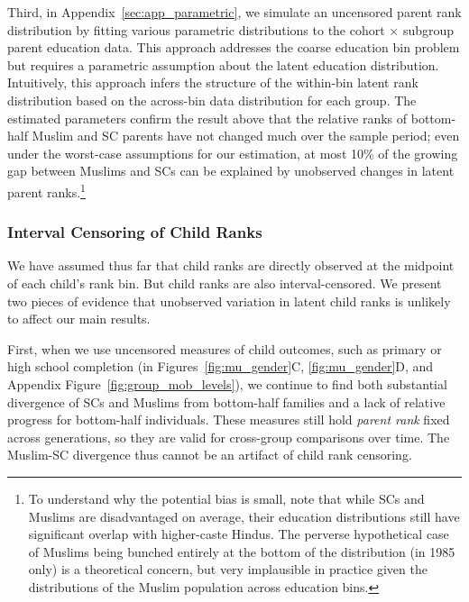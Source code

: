 \documentclass[12pt,letterpaper]{article}
\numberwithin{equation}{section}
\begin{document}
Third, in Appendix~\ref{sec:app_parametric}, we simulate an uncensored parent rank distribution by fitting various parametric distributions to the cohort $\times$ subgroup parent education data. This approach addresses the coarse education bin problem but requires a parametric assumption about the latent education distribution. Intuitively, this approach infers the structure of the within-bin latent rank distribution based on the across-bin data distribution for each group. The estimated parameters confirm the result above that the relative ranks of bottom-half Muslim and SC parents have not changed much over the sample period; even under the worst-case assumptions for our estimation, at most 10\% of the growing gap between Muslims and SCs can be explained by unobserved changes in latent parent ranks.\footnote{To understand why the potential bias is small, note that while SCs and Muslims are disadvantaged on average, their education distributions still have significant overlap with higher-caste Hindus. The perverse hypothetical case of Muslims being bunched entirely at the bottom of the distribution (in 1985 only) is a theoretical concern, but very implausible in practice given the distributions of the Muslim population across education bins.}

\subsubsection{Interval Censoring of Child Ranks}
\label{sec:childcens}

We have assumed thus far that child ranks are directly observed at the midpoint of each child's rank bin. But child ranks are also interval-censored. We present two pieces of evidence that unobserved variation in latent child ranks is unlikely to affect our main results.

First, when we use uncensored measures of child outcomes, such as primary or high school completion (in Figures~\ref{fig:mu_gender}C, \ref{fig:mu_gender}D, and Appendix Figure~\ref{fig:group_mob_levels}), we continue to find both substantial divergence of SCs and Muslims from bottom-half families and a lack of relative progress for bottom-half individuals. These measures still hold \textit{parent rank} fixed across generations, so they are valid for cross-group comparisons over time. The Muslim-SC divergence thus cannot be an artifact of child rank censoring.
\end{document}

